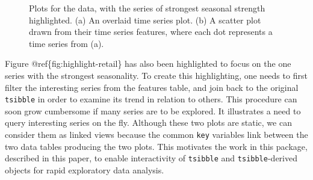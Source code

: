 \begin{Schunk}
\begin{figure}

{\centering {}

}

\caption[Plots for the  data, with the series of strongest seasonal strength highlighted]{Plots for the  data, with the series of strongest seasonal strength highlighted. (a) An overlaid time series plot. (b) A scatter plot drawn from their time series features, where each dot represents a time series from (a).}\label{fig:highlight-retail}
\end{figure}
\end{Schunk}

Figure @ref\{fig:highlight-retail\} has also been highlighted to focus
on the one series with the strongest seasonality. To create this
highlighting, one needs to first filter the interesting series from the
features table, and join back to the original \texttt{tsibble} in order
to examine its trend in relation to others. This procedure can soon grow
cumbersome if many series are to be explored. It illustrates a need to
query interesting series on the fly. Although these two plots are
static, we can consider them as linked views because the common
\texttt{key} variables link between the two data tables producing the
two plots. This motivates the work in this package, described in this
paper, to enable interactivity of \texttt{tsibble} and
\texttt{tsibble}-derived objects for rapid exploratory data analysis.

